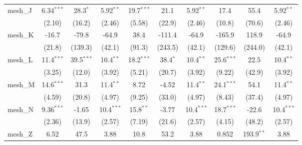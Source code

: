 \begin{tabular}{lccccccccc}
   mesh\_J                                                     & 6.34$^{***}$  & 28.3$^{*}$     & 5.92$^{**}$   & 19.7$^{***}$   & 21.1           & 5.92$^{**}$   & 17.4           & 55.4           & 5.92$^{**}$\\   
                                                               & (2.10)        & (16.2)         & (2.46)        & (5.58)         & (22.9)         & (2.46)        & (10.8)         & (70.6)         & (2.46)\\   
   mesh\_K                                                     & -16.7         & -79.8          & -64.9         & 38.4           & -111.4         & -64.9         & -165.9         & 118.9          & -64.9\\   
                                                               & (21.8)        & (139.3)        & (42.1)        & (91.3)         & (243.5)        & (42.1)        & (129.6)        & (244.0)        & (42.1)\\   
   mesh\_L                                                     & 11.4$^{***}$  & 39.5$^{***}$   & 10.4$^{**}$   & 18.2$^{***}$   & 38.4$^{*}$     & 10.4$^{**}$   & 25.6$^{***}$   & 22.5           & 10.4$^{**}$\\   
                                                               & (3.25)        & (12.0)         & (3.92)        & (5.21)         & (20.7)         & (3.92)        & (9.22)         & (42.9)         & (3.92)\\   
   mesh\_M                                                     & 14.6$^{***}$  & 31.3           & 11.4$^{**}$   & 8.72           & -4.52          & 11.4$^{**}$   & 24.1$^{***}$   & 54.1           & 11.4$^{**}$\\   
                                                               & (4.59)        & (20.8)         & (4.97)        & (9.25)         & (33.0)         & (4.97)        & (8.43)         & (37.4)         & (4.97)\\   
   mesh\_N                                                     & 9.36$^{***}$  & -1.65          & 10.4$^{***}$  & 15.8$^{**}$    & -3.77          & 10.4$^{***}$  & 18.7$^{***}$   & -22.6          & 10.4$^{***}$\\   
                                                               & (2.36)        & (13.9)         & (2.57)        & (7.19)         & (21.6)         & (2.57)        & (4.15)         & (48.2)         & (2.57)\\   
   mesh\_Z                                                     & 6.52          & 47.5           & 3.88          & 10.8           & 53.2           & 3.88          & 0.852          & 193.9$^{**}$   & 3.88\\   

\end{tabular}
